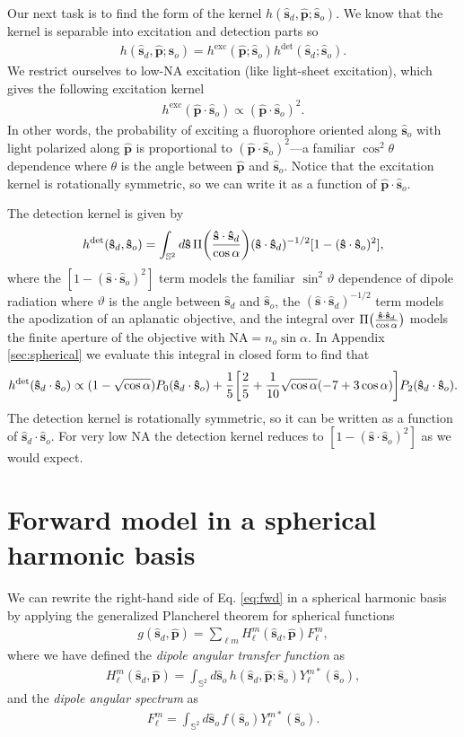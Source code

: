 \documentclass[11pt]{article}
\providecommand{\so}{\mathbf{\hat{s}}_o}
\providecommand{\sd}{\mathbf{\hat{s}}_d}
\providecommand{\pp}{\mathbf{\hat{p}}}
\providecommand{\mh}[1]{\mathbf{\hat{#1}}}
\providecommand{\mbb}[1]{\mathbb{#1}}
\providecommand{\ints}[1]{\int_{\mbb{S}^{#1}}}
\let\originalleft\left
\let\originalright\right
\renewcommand{\left}{\mathopen{}\mathclose\bgroup\originalleft}
\renewcommand{\right}{\aftergroup\egroup\originalright}
\begin{document}
Our next task is to find the form of the kernel $h(\sd,\pp;\so)$. We know that
the kernel is separable into excitation and detection parts so
\begin{align}
  h(\sd, \pp;\so) = h^{\text{exc}}(\pp;\so)h^{\text{det}}(\sd;\so). \label{eq:kern}
\end{align}
We restrict ourselves to low-NA excitation (like light-sheet excitation), which
gives the following excitation kernel
\begin{align}
  h^{\text{exc}}(\pp\cdot\so) \propto (\pp\cdot\so)^2. \label{eq:exckern}
\end{align}
In other words, the probability of exciting a fluorophore oriented along $\so$
with light polarized along $\pp$ is proportional to $(\pp\cdot\so)^2$---a
familiar $\cos^2\theta$ dependence where $\theta$ is the angle between $\pp$ and
$\so$. Notice that the excitation kernel is rotationally symmetric, so we can
write it as a function of $\pp\cdot\so$.

The detection kernel is given by
\begin{align}
  h^{\text{det}}(\sd,\so) = \ints{2}d\mh{s}\,\Pi\left(\frac{\mh{s}\cdot\sd}{\cos\alpha}\right)(\mh{s}\cdot\sd)^{-1/2}[1 - (\mh{s}\cdot\so)^2], \label{eq:detkern}
\end{align}
where the $[1 - (\mh{s}\cdot\so)^2]$ term models the familiar $\sin^2\vartheta$
dependence of dipole radiation where $\vartheta$ is the angle between $\sd$ and
$\so$, the $(\mh{s}\cdot\sd)^{-1/2}$ term models the apodization of an aplanatic
objective, and the integral over
$\Pi\left(\frac{\mh{s}\cdot\sd}{\cos\alpha}\right)$ models the finite aperture
of the objective with $\text{NA} = n_o\sin\alpha$. In Appendix
\ref{sec:spherical} we evaluate this integral in closed form to find that
\begin{align}
  h^{\text{det}}(\sd\cdot\so) \propto (1 - \sqrt{\cos\alpha})P_0(\sd\cdot\so) + \frac{1}{5}\left[\frac{2}{5} + \frac{1}{10}\sqrt{\cos\alpha}(-7+3\cos\alpha)\right]P_2(\sd\cdot\so).
\end{align}
The detection kernel is rotationally symmetric, so it can be written as a
function of $\sd\cdot\so$. For very low NA the detection kernel reduces to
$[1 - (\mh{s}\cdot\so)^2]$ as we would expect.

\section{Forward model in a spherical harmonic basis} \label{sec:shsec}We can rewrite the right-hand side of Eq. \eqref{eq:fwd} in a spherical harmonic
basis by applying the generalized Plancherel theorem for spherical functions
\begin{align}
  g(\sd, \pp) = \sum_{\ell m}H_\ell^m(\sd, \pp)F_\ell^m,\label{eq:fwdsh}
\end{align}
where we have defined the \textit{dipole angular transfer function} as
\begin{align}
  H_\ell^m(\sd, \pp) = \ints{2}d\so\, h(\sd,\pp;\so)Y_\ell^{m*}(\so),
\end{align}
and the \textit{dipole angular spectrum} as
\begin{align}
  F_\ell^m = \ints{2}d\so\, f(\so)Y_\ell^{m*}(\so).
\end{align}
\end{document}
